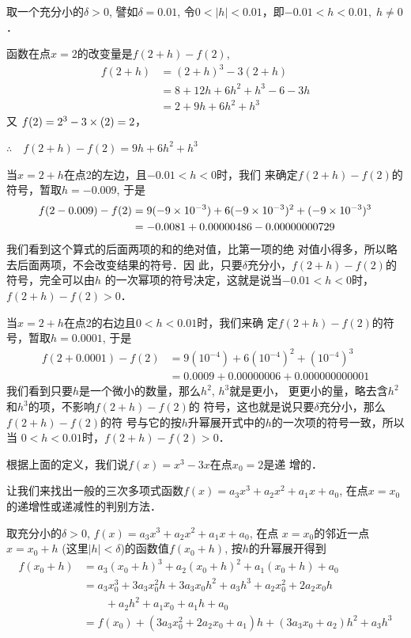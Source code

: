 \begin{solution}
    取一个充分小的$\delta>0$, 譬如$\delta=0.01$, 令$0<|h|<0.01$，即$-0.01<h<0.01,\; h\ne 0$．

    函数在点$x=2$的改变量是$f(2+h)-f(2)$,
\[\begin{split}
    f(2+h)&=(2 +h)^3-3(2+h)\\
  &  =8+12h+6h^2+h^3-6-3h\\
   & =2+9h+6h^2+h^3
\end{split} \]   
    又
  $  f(2)=2^3-3\times(2)=2$，


$\therefore\quad f(2+h)-f(2)=9h+6h^2+h^3$

    当$x=2+h$在点2的左边，且$-0.01<h<0$时，我们
    来确定$f(2+h)-f(2)$的符号，暂取$h=-0.009$, 于是
\[\begin{split}
      f(2-0.009)-f(2)&=9(-9\times10^{-3})+6(-9\times10^{-3})^2+(-9\times10^{-3})^3\\
 &   =-0.0081+0.00000486-0.00000000729  
\end{split}\]
    我们看到这个算式的后面两项的和的绝对值，比第一项的绝
    对值小得多，所以略去后面两项，不会改变结果的符号．因
    此，只要$\delta$充分小，$f(2+h)-f(2)$的符号，完全可以由$h$
    的一次幂项的符号决定，这就是说当$-0.01<h<0$时，$f(2+h)-f(2)>0$．

    当$x=2+h$在点2的右边且$0<h<0.01$时，我们来确
    定$f(2+h)-f(2)$的符号，暂取$h=0.0001$, 于是
\[\begin{split}
    f(2+0.0001)-f(2)&=9(10^{-4})+6(10^{-4})^2+(10^{-4})^3\\
  &  =0.0009+0.00000006+0.000000000001
\end{split}\]
    我们看到只要$h$是一个微小的数量，那么$h^2$, $h^3$就是更小，
    更更小的量，略去含$h^2$和$h^3$的项，不影响$f(2+h)-f(2)$的
    符号，这也就是说只要$\delta$充分小，那么$f(2+h)-f(2)$的符
    号与它的按$h$升幂展开式中的$h$的一次项的符号一致，所以当
    $0<h<0.01$时，$f(2+h)-f(2)>0$．

    根据上面的定义，我们说$f(x)=x^3-3x$在点$x_0=2$是递
增的．
\end{solution}

让我们来找出一般的三次多项式函数$f(x)=a_3x^3+a_2x^2
+a_1x+a_0$, 在点$x=x_0$的递增性或递减性的判别方法．

取充分小的$\delta>0$, $f(x)=a_3x^3+a_2x^2
+a_1x+a_0$, 在点
$x=x_0$的邻近一点$x=x_0+h$ (这里$|h|<\delta$)的函数值$f(x_0+h)$, 
按$h$的升幂展开得到
\[\begin{split}
    f(x_0+h) &= a_3 (x_0 +h)^3 +a_2(x_0 +h)^2 + a_1 (x_0 +h) + a_0\\
&=a_3x_0^3+3a_3x_0^2h+3a_3x_0h^2+a_3h^3+a_2x_0^2+2a_2x_0h\\
&\qquad +a_2h^2+a_1x_0+a_1h+a_0\\
&=f(x_0)+(3a_3x_0^2+2a_2x_0+a_1)h+(3a_3x_0+
a_2)h^2+a_3h^3
\end{split}\]

